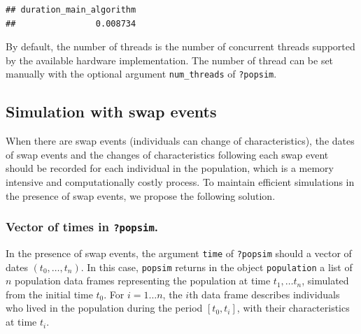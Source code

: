 \begin{Shaded}
\begin{Highlighting}[]
\StringTok{ }
                   \NormalTok{, } \NormalTok{)}
\end{Highlighting}
\end{Shaded}

\begin{verbatim}
## duration_main_algorithm 
##                0.008734
\end{verbatim}

By default, the number of threads is the number of concurrent threads supported by the available hardware implementation. The number of thread can be set manually with the optional argument \texttt{num\_threads} of \texttt{?popsim}.

\hypertarget{simulationswap}{%
\subsection{Simulation with swap events}\label{simulationswap}}

When there are swap events (individuals can change of characteristics), the dates of swap events and the changes of characteristics following each swap event should be recorded for each individual in the population, which is a memory intensive and computationally costly process.
To maintain efficient simulations in the presence of swap events, we propose the following solution.

\hypertarget{vector-of-times-in-popsim.}{%
\subsubsection{\texorpdfstring{Vector of times in \texttt{?popsim}.}{Vector of times in ?popsim.}}\label{vector-of-times-in-popsim.}}

In the presence of swap events, the argument \texttt{time} of \texttt{?popsim} should a vector of dates \((t_0,\dots, t_n)\). In this case, \texttt{popsim} returns in the object \texttt{population} a list of \(n\) population data frames representing the population at time \(t_1,\dots t_n\), simulated from the initial time \(t_0\).
For \(i=1\dots n\), the \(i\)th data frame describes individuals who lived in the population during the period \([t_0,t_i]\), with their characteristics at time \(t_i\).

